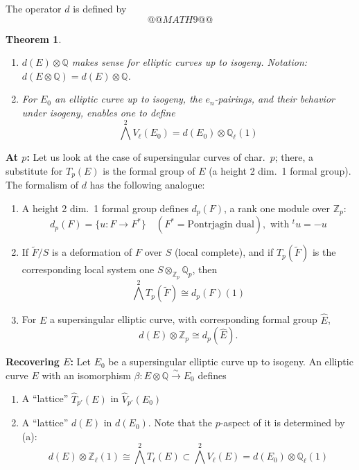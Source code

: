 \documentclass[11pt,a4paper]{article}
\theoremstyle{plain}
\newtheorem{theorem}{Theorem}[section]
\theoremstyle{definition}
\theoremstyle{remark}
\newcommand{\Q}{\mathbb{Q}}
\newcommand{\Zp}{\mathbb{Z}_{p}}
\newcommand{\Qp}{\mathbb{Q}_{p}}
\newcommand{\Zl}{\mathbb{Z}_{\ell}}
\newcommand{\Ql}{\mathbb{Q}_{\ell}}
\newcommand{\Tp}{T_{p}}
\newcommand{\Vl}{V_{\ell}}
\newcommand{\Tl}{T_{\ell}}
\begin{document}
The operator $d$ is defined by
\[
@@MATH9@@
\]

\begin{theorem}
\begin{enumerate}[label=(\alph*)]
\item $d(E) \otimes \Q$ makes sense for elliptic curves up to isogeny. Notation: $d(E \otimes \Q) = d(E) \otimes \Q$.

\item For $E_{0}$ an elliptic curve up to isogeny, the $e_{n}$-pairings, and their behavior under isogeny, enables one to define
\[
\bigwedge^{2} \Vl(E_{0}) = d(E_{0}) \otimes \Ql(1)
\]
\end{enumerate}
\end{theorem}

\noindent
\textbf{At $p$:} Let us look at the case of supersingular curves of char.\ $p$; there, a substitute for $\Tp(E)$ is the formal group of $E$ (a height 2 dim.\ 1 formal group). The formalism of $d$ has the following analogue:
\begin{enumerate}[label=(\alph*)]
\item A height 2 dim.\ 1 formal group defines $d_{p}(F)$, a rank one module over $\Zp$:
\[
d_{p}(F) = \{u : F \to F^{*}\} \quad (F^{*} = \text{Pontrjagin dual}), \text{ with } {}^{t}u = -u
\]
\item If $\widetilde{F}/S$ is a deformation of $F$ over $S$ (local complete), and if $\Tp(\widetilde{F})$ is the corresponding local system one $S \otimes_{\Zp} \Qp$, then
\[
\bigwedge^{2} \Tp(\widetilde{F}) \cong d_{p}(F)(1)
\]
\item For $E$ a supersingular elliptic curve, with corresponding formal group $\widehat{E}$,
\[
d(E) \otimes \Zp \cong d_{p}(\widehat{E}).
\]
\end{enumerate}

\noindent
\textbf{Recovering $E$:} Let $E_{0}$ be a supersingular elliptic curve up to isogeny. An elliptic curve $E$ with an isomorphism $\beta : E \otimes \Q \xrightarrow{\sim} E_{0}$ defines
\begin{enumerate}[label=(\alph*)]
\item A ``lattice'' $\widehat{T}_{p'}(E)$ in $\widehat{V}_{p'}(E_{0})$
\item A ``lattice'' $d(E)$ in $d(E_{0})$. Note that the $p$-aspect of it is determined by (a):
\[
d(E) \otimes \Zl(1) \cong \bigwedge^{2} \Tl(E) \subset \bigwedge^{2} \Vl(E) = d(E_{0}) \otimes \Ql(1)
\]
\end{enumerate}
\end{document}
